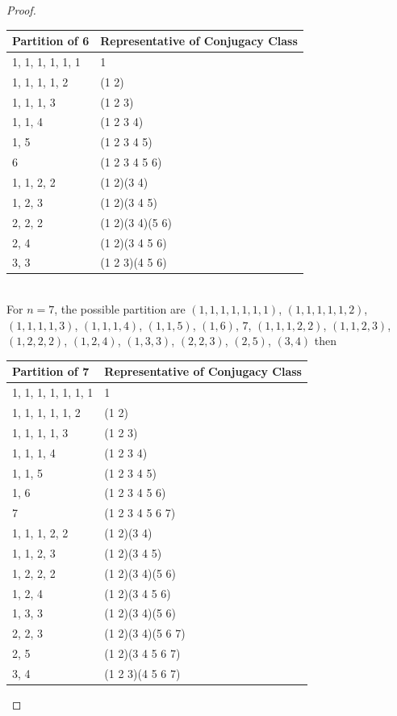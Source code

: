 \documentclass{article}
\begin{document}
\begin{proof}
\begin{table}[h!]
\begin{tabular}{l|l}
        \textbf{Partition of 6} & \textbf{Representative of Conjugacy Class} \\ \hline
        1, 1, 1, 1, 1, 1 & 1\\
        1, 1, 1, 1, 2 & (1 2)\\
        1, 1, 1, 3 & (1 2 3)\\
        1, 1, 4 & (1 2 3 4)\\
        1, 5 & (1 2 3 4 5)\\
        6 & (1 2 3 4 5 6)\\
        1, 1, 2, 2 & (1 2)(3 4)\\
        1, 2, 3 & (1 2)(3 4 5)\\
        2, 2, 2 & (1 2)(3 4)(5 6)\\
        2, 4 & (1 2)(3 4 5 6)\\
        3, 3 & (1 2 3)(4 5 6)\\
    \end{tabular}
\end{table}\\
For $n=7$, the possible partition are $(1, 1, 1, 1, 1, 1, 1)$, $(1, 1, 1, 1, 1, 2)$, $(1, 1, 1, 1, 3)$, $(1, 1, 1, 4)$, $(1, 1, 5)$, $(1, 6)$, $7$, $(1, 1, 1, 2, 2)$, $(1, 1, 2, 3)$, $(1, 2, 2, 2)$, $(1, 2, 4)$,  $(1, 3, 3)$, $(2, 2, 3)$, $(2, 5)$, $(3, 4)$ then 
    \begin{center}

    \begin{tabular}{l|l}

        \textbf{Partition of 7} & \textbf{Representative of Conjugacy Class} \\ \hline
        1, 1, 1, 1, 1, 1, 1 & 1\\
        1, 1, 1, 1, 1, 2 & (1 2)\\
        1, 1, 1, 1, 3 & (1 2 3)\\
        1, 1, 1, 4 & (1 2 3 4)\\
        1, 1, 5 & (1 2 3 4 5)\\
        1, 6 & (1 2 3 4 5 6)\\
        7 & (1 2 3 4 5 6 7)\\
        1, 1, 1, 2, 2 & (1 2)(3 4)\\
        1, 1, 2, 3 & (1 2)(3 4 5)\\
        1, 2, 2, 2 & (1 2)(3 4)(5 6)\\
        1, 2, 4 & (1 2)(3 4 5 6)\\
        1, 3, 3 & (1 2)(3 4)(5 6)\\
        2, 2, 3 & (1 2)(3 4)(5 6 7)\\
        2, 5 & (1 2)(3 4 5 6 7)\\
        3, 4 & (1 2 3)(4 5 6 7)\\
    \end{tabular}
    \end{center}
\end{proof}
\end{document}
